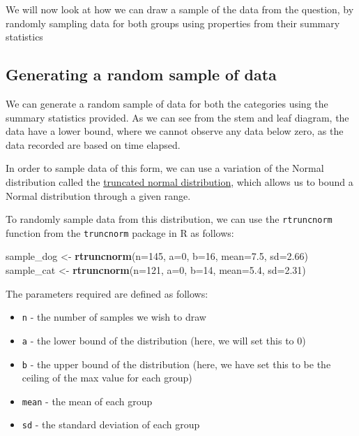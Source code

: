 \documentclass[
]{book}
\newenvironment{Shaded}{\begin{snugshade}}{\end{snugshade}}
\newcommand{\DataTypeTok}[1]{\textcolor[rgb]{0.13,0.29,0.53}{#1}}
\newcommand{\DecValTok}[1]{\textcolor[rgb]{0.00,0.00,0.81}{#1}}
\newcommand{\FloatTok}[1]{\textcolor[rgb]{0.00,0.00,0.81}{#1}}
\newcommand{\KeywordTok}[1]{\textcolor[rgb]{0.13,0.29,0.53}{\textbf{#1}}}
\newcommand{\NormalTok}[1]{#1}
\newcommand{\StringTok}[1]{\textcolor[rgb]{0.31,0.60,0.02}{#1}}
\providecommand{\tightlist}{%
  \setlength{\itemsep}{0pt}\setlength{\parskip}{0pt}}
\begin{document}
We will now look at how we can draw a sample of the data from the question, by randomly sampling data for both groups using properties from their summary statistics

\hypertarget{generating-a-random-sample-of-data}{%
\subsection{Generating a random sample of data}\label{generating-a-random-sample-of-data}}

We can generate a random sample of data for both the categories using the summary statistics provided. As we can see from the stem and leaf diagram, the data have a lower bound, where we cannot observe any data below zero, as the data recorded are based on time elapsed.

In order to sample data of this form, we can use a variation of the Normal distribution called the \href{https://en.wikipedia.org/wiki/Truncated_normal_distribution}{truncated normal distribution}, which allows us to bound a Normal distribution through a given range.

To randomly sample data from this distribution, we can use the \texttt{rtruncnorm} function from the \texttt{truncnorm} package in R as follows:

\begin{Shaded}
\begin{Highlighting}[]
\NormalTok{sample_dog <-}\StringTok{ }\KeywordTok{rtruncnorm}\NormalTok{(}\DataTypeTok{n=}\DecValTok{145}\NormalTok{, }\DataTypeTok{a=}\DecValTok{0}\NormalTok{, }\DataTypeTok{b=}\DecValTok{16}\NormalTok{, }\DataTypeTok{mean=}\FloatTok{7.5}\NormalTok{, }\DataTypeTok{sd=}\FloatTok{2.66}\NormalTok{)}
\NormalTok{sample_cat <-}\StringTok{ }\KeywordTok{rtruncnorm}\NormalTok{(}\DataTypeTok{n=}\DecValTok{121}\NormalTok{, }\DataTypeTok{a=}\DecValTok{0}\NormalTok{, }\DataTypeTok{b=}\DecValTok{14}\NormalTok{, }\DataTypeTok{mean=}\FloatTok{5.4}\NormalTok{, }\DataTypeTok{sd=}\FloatTok{2.31}\NormalTok{)}
\end{Highlighting}
\end{Shaded}

The parameters required are defined as follows:

\begin{itemize}
\tightlist
\item
  \texttt{n} - the number of samples we wish to draw
\item
  \texttt{a} - the lower bound of the distribution (here, we will set this to 0)
\item
  \texttt{b} - the upper bound of the distribution (here, we have set this to be the ceiling of the max value for each group)
\item
  \texttt{mean} - the mean of each group
\item
  \texttt{sd} - the standard deviation of each group
\end{itemize}
\end{document}
